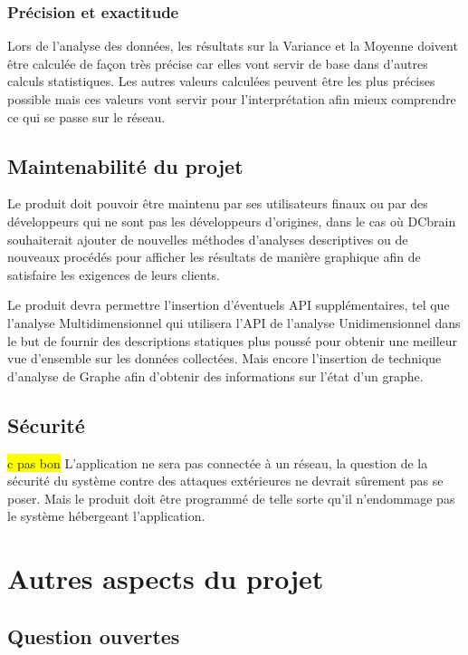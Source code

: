 			\subsubsection{Précision et exactitude}
			Lors de l'analyse des données, les résultats sur la Variance et la Moyenne doivent être calculée de façon très précise car elles vont servir de base dans d’autres calculs statistiques. Les autres valeurs calculées peuvent être les plus précises possible mais ces valeurs vont servir pour l'interprétation afin mieux comprendre ce qui se passe sur le réseau.

		\subsection{Maintenabilité du projet}
		Le produit doit pouvoir être maintenu par ses utilisateurs finaux ou par des développeurs qui ne sont pas les développeurs d’origines, dans le cas où DCbrain souhaiterait ajouter de nouvelles méthodes d’analyses descriptives ou de nouveaux procédés pour afficher les résultats de manière graphique afin de satisfaire les exigences de leurs clients.\newline
		
		Le produit devra permettre l'insertion d'éventuels API supplémentaires, tel que l'analyse Multidimensionnel qui utilisera l'API de l'analyse Unidimensionnel dans le but de fournir des descriptions statiques plus poussé pour obtenir une meilleur vue d'ensemble sur les données collectées. Mais encore l'insertion de technique d'analyse de Graphe afin d'obtenir des informations sur l'état d'un graphe.
		
		\subsection{Sécurité} \colorbox{yellow}{c pas bon}
		L’application ne sera pas connectée à un réseau, la question de la sécurité du système contre des attaques extérieures ne devrait sûrement pas se poser. Mais le produit doit être programmé de telle sorte qu’il n’endommage pas le système hébergeant l’application.
		
	\section{Autres aspects du projet}
		\subsection{Question ouvertes}
		
